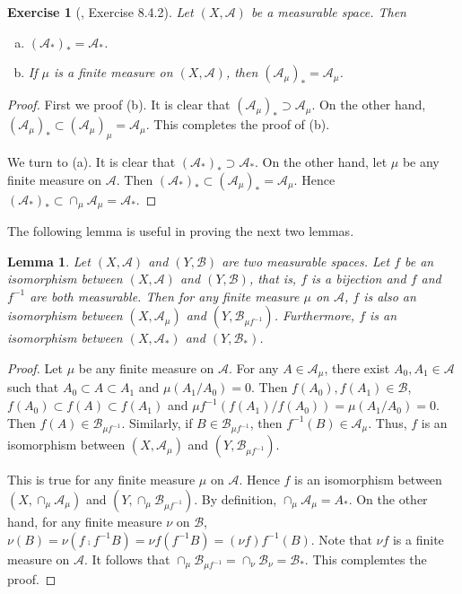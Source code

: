 \documentclass[11pt]{article}
\theoremstyle{plain}
\newtheorem{exercise}{Exercise}
\newtheorem{lemma}{Lemma}
\theoremstyle{definition}
\theoremstyle{remark}
\begin{document}
\begin{exercise}[\cite{book:992991}, Exercise 8.4.2]
    Let $(X, \mathscr A)$ be a measurable space. Then
    \begin{enumerate}[(a)]
        \item 
            $(\mathscr A_*)_* = \mathscr A_*$.
        \item
            If $\mu$ is a finite measure on $(X,\mathscr A)$, then $(\mathscr A_\mu)_* = \mathscr A_\mu$.
    \end{enumerate}
\end{exercise}
\begin{proof}
    First we proof (b). 
    It is clear that $(\mathscr A_\mu)_* \supset \mathscr A_\mu$.
    On the other hand, $(\mathscr A_\mu)_* \subset (\mathscr A_\mu)_\mu = \mathscr A_\mu$.
    This completes the proof of (b).

    We turn to (a). 
    It is clear that $(\mathscr A_*)_* \supset \mathscr A_*$.
    On the other hand, let $ \mu $ be any finite measure on $\mathscr A$.
    Then $(\mathscr A_*)_* \subset  (\mathscr A_\mu)_* = \mathscr A_{\mu}$.
    Hence $(\mathscr A_*)_* \subset  \cap_{\mu} \mathscr A_{\mu} = \mathscr A_*$.
\end{proof}


The following lemma is useful in proving the next two lemmas.
\begin{lemma}
    Let $(X,\mathscr A)$ and $(Y, \mathscr B)$ are two measurable spaces. 
    Let $f$ be an isomorphism between $(X,\mathscr A)$ and $(Y, \mathscr B)$, that is, $f$ is a bijection and $f$ and $f^{-1}$ are both measurable.
    Then for any finite measure $\mu$ on $\mathscr A$, $f$ is also an isomorphism between $(X,\mathscr A_\mu)$ and $ (Y,\mathscr B_{\mu f^{-1}})$.
    Furthermore, $f$ is an isomorphism between $(X,\mathscr A_*)$ and $ (Y,\mathscr B_*)$.
    \label{lemma:BorelIso}
\end{lemma}
\begin{proof}
    Let $\mu$ be any finite measure on $\mathscr A$.
    For any $A\in \mathscr A_\mu$, there exist $A_0,A_1\in \mathscr A$ such that $A_0 \subset A \subset A_1$ and $\mu(A_1/A_0)=0$.
    Then $f(A_0), f(A_1) \in \mathscr B$, $f(A_0)\subset f(A) \subset f(A_1)$ and $\mu f^{-1} (f(A_1) / f(A_0)) = \mu (A_1 / A_0) = 0$. Then $f(A)\in \mathscr B_{\mu f^{-1}}$.
    Similarly, if $B \in \mathscr B_{\mu f^{-1}}$, then $f^{-1}(B) \in \mathscr A_\mu$.
    Thus, $f$ is an isomorphism between $(X,\mathscr A_\mu)$ and $ (Y,\mathscr B_{\mu f^{-1}})$.

    This is true for any finite measure $\mu$ on $\mathscr A$.
    Hence $f$ is an isomorphism between $(X, \cap_{\mu}\mathscr A_\mu)$ and $ (Y,\cap_{\mu} \mathscr B_{\mu f^{-1}})$.
    By definition, $\cap_{\mu}\mathscr A_\mu = A_*$.
    On the other hand, for any finite measure $\nu$ on $\mathscr B$, $\nu (B)= \nu (f \comp f^{-1} B)= \nu f ( f^{-1} B) =  (\nu f) f^{-1} (B)$.
    Note that $\nu f$ is a finite measure on $\mathscr A$.
    It follows that  $\cap_{\mu} \mathscr B_{\mu f^{-1}}= \cap_{\nu} \mathscr B_{\nu}= \mathscr B_*$.
    This complemtes the proof.
\end{proof}
\end{document}

